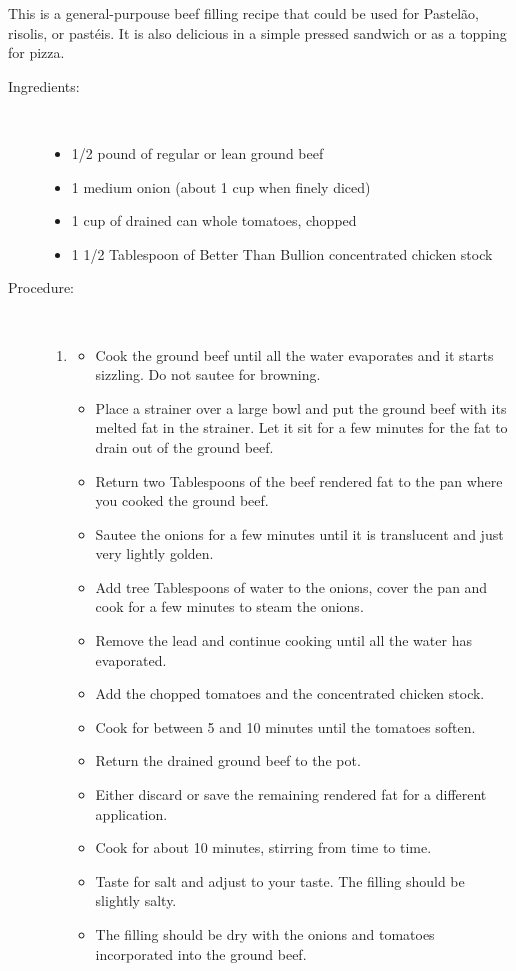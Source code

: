 \documentclass[11pt,letterpaper]{article}
\newcommand \fileName {BeefFilling}
\begin{document}


This is a general-purpouse beef filling recipe that could be used for Pastel\~ao, risolis, or past\'eis. It is also delicious in a simple pressed sandwich or as a topping for pizza.
 
\begin{description}

\item[Ingredients:]\ \\
	\begin{itemize}
	\item 1/2 pound of regular or lean ground beef
	\item 1 medium onion (about 1 cup when finely diced)
	\item 1 cup of drained can whole tomatoes, chopped
	\item 1 1/2 Tablespoon of Better Than Bullion concentrated chicken stock
	\end{itemize}

\item[Procedure:]\ \\
	\begin{enumerate}
	\item[Make the Filling]
	\begin{itemize}
        \item Cook the ground beef until all the water evaporates and it starts sizzling. Do not sautee for browning.
        \item Place a strainer over a large bowl and put the ground beef with its melted fat in the strainer. Let it sit for a few minutes for the fat to drain out of the ground beef.
        \item Return two Tablespoons of the beef rendered fat to the pan where you cooked the ground beef.
        \item Sautee the onions for a few minutes until it is translucent and just very lightly golden. 
        \item Add tree Tablespoons of water to the onions, cover the pan and cook for a few minutes to steam the onions. 
        \item Remove the lead and continue cooking until all the water has evaporated.
        \item Add the chopped tomatoes and the concentrated chicken stock.
        \item Cook for between 5 and 10 minutes until the tomatoes soften.
        \item Return the drained ground beef to the pot.
        \item Either discard or save the remaining rendered fat for a different application.
        \item Cook for about 10 minutes, stirring from time to time.
        \item Taste for salt and adjust to your taste. The filling should be slightly salty.
        \item The filling should be dry with the onions and tomatoes incorporated into the ground beef.
        \end{itemize}
  	\end{enumerate}
\end{description}

%
\end{document}
